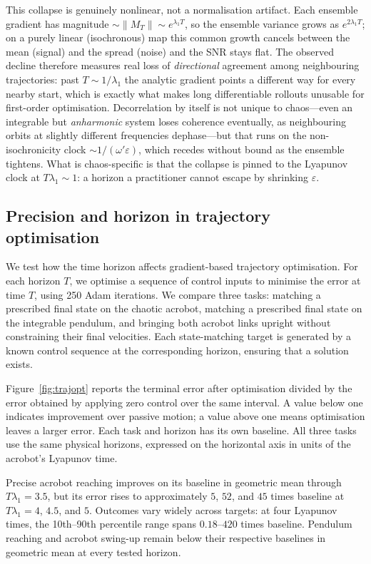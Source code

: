\documentclass[11pt]{article}
\newcommand{\norm}[1]{\left\lVert #1 \right\rVert}
\begin{document}
This collapse is genuinely nonlinear, not a normalisation artifact. Each ensemble gradient has
magnitude $\sim\norm{M_T}\sim e^{\lambda_1 T}$, so the ensemble variance grows as $e^{2\lambda_1 T}$;
on a purely linear (isochronous) map this common growth cancels between the mean (signal) and the
spread (noise) and the SNR stays flat. The observed decline therefore measures real loss of
\emph{directional} agreement among neighbouring trajectories: past $T\sim1/\lambda_1$ the analytic
gradient points a different way for every nearby start, which is exactly what makes long differentiable
rollouts unusable for first-order optimisation. Decorrelation by itself is not unique to chaos---even an
integrable but \emph{anharmonic} system loses coherence eventually, as neighbouring orbits at slightly
different frequencies dephase---but that runs on the non-isochronicity clock $\sim1/(\omega'\varepsilon)$,
which recedes without bound as the ensemble tightens. What is chaos-specific is that the collapse is
pinned to the Lyapunov clock at $T\lambda_1\sim1$: a horizon a practitioner cannot escape by shrinking
$\varepsilon$.

\subsection{Precision and horizon in trajectory optimisation}\label{sec:A-consequence}
We test how the time horizon affects gradient-based trajectory optimisation. For each
horizon $T$, we optimise a sequence of control inputs to minimise the error at time $T$,
using 250 Adam iterations. We compare three tasks: matching a prescribed final state on
the chaotic acrobot, matching a prescribed final state on the integrable pendulum, and
bringing both acrobot links upright without constraining their final velocities. Each
state-matching target is generated by a known control sequence at the corresponding
horizon, ensuring that a solution exists.

Figure~\ref{fig:trajopt} reports the terminal error after optimisation divided by the error
obtained by applying zero control over the same interval. A value below one indicates
improvement over passive motion; a value above one means optimisation leaves a larger
error. Each task and horizon has its own baseline. All three tasks use the same physical
horizons, expressed on the horizontal axis in units of the acrobot's Lyapunov time.

Precise acrobot reaching improves on its baseline in geometric mean through
$T\lambda_1=3.5$, but its error rises to approximately $5$, $52$, and $45$ times baseline
at $T\lambda_1=4$, $4.5$, and $5$. Outcomes vary widely across targets: at four Lyapunov
times, the 10th--90th percentile range spans $0.18$--$420$ times baseline. Pendulum
reaching and acrobot swing-up remain below their respective baselines in geometric mean
at every tested horizon.
\end{document}
